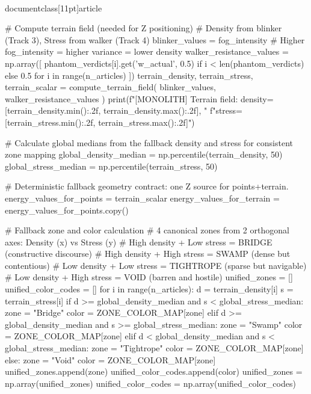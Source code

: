 \\documentclass[11pt]{article}
\begin{document}
\begin{CodeBlock}
{{{{{        # Compute terrain field (needed for Z positioning)
        # Density from blinker (Track 3), Stress from walker (Track 4)
        blinker_values = fog_intensity  # Higher fog_intensity = higher variance = lower density
        walker_resistance_values = np.array([
            phantom_verdicts[i].get('w_actual', 0.5) if i < len(phantom_verdicts) else 0.5
            for i in range(n_articles)
        ])
        terrain_density, terrain_stress, terrain_scalar = compute_terrain_field(
            blinker_values, walker_resistance_values
        )
        print(f"[MONOLITH] Terrain field: density=[{terrain_density.min():.2f}, {terrain_density.max():.2f}], "
              f"stress=[{terrain_stress.min():.2f}, {terrain_stress.max():.2f}]")

        # Calculate global medians from the fallback density and stress for consistent zone mapping
        global_density_median = np.percentile(terrain_density, 50)
        global_stress_median = np.percentile(terrain_stress, 50)

        # Deterministic fallback geometry contract: one Z source for points+terrain.
        energy_values_for_points = terrain_scalar
        energy_values_for_terrain = energy_values_for_points.copy()

        # Fallback zone and color calculation
        # 4 canonical zones from 2 orthogonal axes: Density (x) vs Stress (y)
        #   High density + Low stress  = BRIDGE    (constructive discourse)
        #   High density + High stress = SWAMP     (dense but contentious)
        #   Low density  + Low stress  = TIGHTROPE (sparse but navigable)
        #   Low density  + High stress = VOID      (barren and hostile)
        unified_zones = []
        unified_color_codes = []
        for i in range(n_articles):
            d = terrain_density[i]
            s = terrain_stress[i]
            if d >= global_density_median and s < global_stress_median:
                zone = "Bridge"
                color = ZONE_COLOR_MAP[zone]
            elif d >= global_density_median and s >= global_stress_median:
                zone = "Swamp"
                color = ZONE_COLOR_MAP[zone]
            elif d < global_density_median and s < global_stress_median:
                zone = "Tightrope"
                color = ZONE_COLOR_MAP[zone]
            else:
                zone = "Void"
                color = ZONE_COLOR_MAP[zone]
            unified_zones.append(zone)
            unified_color_codes.append(color)
        unified_zones = np.array(unified_zones)
        unified_color_codes = np.array(unified_color_codes)

}}}}}
\end{CodeBlock}
\end{document}
